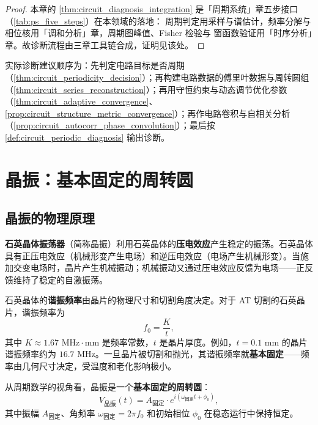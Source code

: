\begin{proof}
本章的 \cref{thm:circuit_diagnosis_integration} 是「周期系统」章五步接口（\cref{tab:ps_five_steps}）在本领域的落地：
周期判定用采样与谱估计，频率分解与相位核用「调和分析」章，周期图峰值、Fisher 检验与
窗函数验证用「时序分析」章。故诊断流程由三章工具链合成，证明见该处。
\end{proof}

\begin{remark}[整合后的操作顺序]\label{rem:circuit_integration_order}
实际诊断建议顺序为：先判定电路目标是否周期（\cref{thm:circuit_periodicity_decision}）；再构建电路数据的傅里叶数据与周转圆组（\cref{thm:circuit_series_reconstruction}）；再用守恒约束与动态调节优化参数（\cref{thm:circuit_adaptive_convergence}、\cref{prop:circuit_structure_metric_convergence}）；再作电路卷积与自相关分析（\cref{prop:circuit_autocorr_phase_convolution}）；最后按 \cref{def:circuit_periodic_diagnosis} 输出诊断。
\end{remark}

\section{晶振：基本固定的周转圆}

\subsection{晶振的物理原理}

\begin{definition}[石英晶体振荡器]\label{def:quartz_oscillator}
\textbf{石英晶体振荡器}（简称晶振）利用石英晶体的\textbf{压电效应}产生稳定的振荡。石英晶体具有正压电效应（机械形变产生电场）和逆压电效应（电场产生机械形变）。当施加交变电场时，晶片产生机械振动；机械振动又通过压电效应反馈为电场——正反馈维持了稳定的自激振荡。

石英晶体的\textbf{谐振频率}由晶片的物理尺寸和切割角度决定。对于 AT 切割的石英晶片，谐振频率为
\[
f_0 = \frac{K}{t},
\]
其中 $K \approx 1.67 \text{ MHz}\cdot\text{mm}$ 是频率常数，$t$ 是晶片厚度。例如，$t = 0.1$ mm 的晶片谐振频率约为 $16.7$ MHz。一旦晶片被切割和抛光，其谐振频率就\textbf{基本固定}——频率由几何尺寸决定，受温度和老化影响极小。

从周期数学的视角看，晶振是一个\textbf{基本固定的周转圆}：
\[
V_{\text{晶振}}(t) = A_{\text{固定}} \cdot e^{i(\omega_{\text{固定}} t + \phi_0)},
\]
其中振幅 $A_{\text{固定}}$、角频率 $\omega_{\text{固定}} = 2\pi f_0$ 和初始相位 $\phi_0$ 在稳态运行中保持恒定。
\end{definition}

